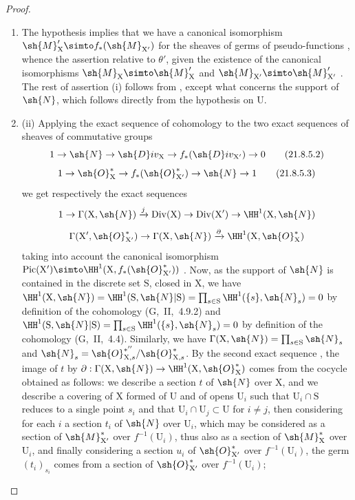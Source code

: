 \begin{proof}
\begin{enumerate}[label=(\roman*)]
  \item The hypothesis implies that we have a canonical isomorphism $\sh{M}'_\mathrm{X}\simto f_*(\sh{M}_{\mathrm{X}'})$ for the sheaves of germs of pseudo-functions , whence the assertion relative to $\theta'$, given the existence of the canonical isomorphisms $\sh{M}_\mathrm{X}\simto\sh{M}'_\mathrm{X}$ and $\sh{M}_{\mathrm{X}'}\simto\sh{M}'_{\mathrm{X}'}$ .
The rest of assertion (i) follows from , except what concerns the support of $\sh{N}$, which follows directly from the hypothesis on $\mathrm{U}$.

  \item (ii) Applying the exact sequence of cohomology to the two exact sequences of sheaves of commutative groups
\[
\label{IV.21.8.5.2}
  1\to\sh{N}\to\sh{D}iv_\mathrm{X}\to f_*(\sh{D}iv_{\mathrm{X}'})\to 0
  \tag{21.8.5.2}
\]
\[
\label{IV.21.8.5.3}
  1\to\sh{O}^*_\mathrm{X}\to f_*(\sh{O}^*_{\mathrm{X}'})\to\sh{N}\to 1
  \tag{21.8.5.3}
\]
we get respectively the exact sequences
\[
  1\to\Gamma(\mathrm{X},\sh{N})\xrightarrow{j}\operatorname{Div}(\mathrm{X})\to\operatorname{Div}(\mathrm{X}')\to\HH^1(\mathrm{X},\sh{N})
\]
\[
  \Gamma(\mathrm{X}',\sh{O}^*_{\mathrm{X}'})\to\Gamma(\mathrm{X},\sh{N})\xrightarrow{\partial}\HH^1(\mathrm{X},\sh{O}^*_\mathrm{X})
\]
taking into account the canonical isomorphism $\operatorname{Pic}(\mathrm{X}')\simto\HH^1(\mathrm{X},f_*(\sh{O}^*_{\mathrm{X}'}))$ .
Now, as the support of $\sh{N}$ is contained in the discrete set $\mathrm{S}$, closed in $\mathrm{X}$, we have $\HH^1(\mathrm{X},\sh{N})=\HH^1(\mathrm{S},\sh{N}|\mathrm{S})=\prod_{s\in\mathrm{S}}\HH^1(\{s\},\sh{N}_s)=0$ by definition of the cohomology (G,~II,~4.9.2) and $\HH^1(\mathrm{S},\sh{N}|\mathrm{S})=\prod_{s\in\mathrm{S}}\HH^1(\{s\},\sh{N}_s)=0$ by definition of the cohomology (G,~II,~4.4).
Similarly, we have $\Gamma(\mathrm{X},\sh{N})=\prod_{s\in\mathrm{S}}\sh{N}_s$ and $\sh{N}_s=\sh{O}^{*''}_{\mathrm{X},s}/\sh{O}^*_{\mathrm{X},s}$.
By the second exact sequence , the image of $t$ by $\partial:\Gamma(\mathrm{X},\sh{N})\to\HH^1(\mathrm{X},\sh{O}^*_\mathrm{X})$ comes from the cocycle obtained as follows: we describe a section $t$ of $\sh{N}$ over $\mathrm{X}$, and we describe a covering of $\mathrm{X}$ formed of $\mathrm{U}$ and of opens $\mathrm{U}_i$ such that $\mathrm{U}_i\cap\mathrm{S}$ reduces to a single point $s_i$ and that $\mathrm{U}_i\cap\mathrm{U}_j\subset\mathrm{U}$ for $i\neq j$, then considering for each $i$ a section $t_i$ of $\sh{N}$ over $\mathrm{U}_i$, which may be considered as a section of $\sh{M}^*_{\mathrm{X}'}$ over $f^{-1}(\mathrm{U}_i)$, thus also as a section of $\sh{M}^*_\mathrm{X}$ over $\mathrm{U}_i$, and finally considering a section $u_i$ of $\sh{O}^*_{\mathrm{X}'}$ over $f^{-1}(\mathrm{U}_i)$, the germ $(t_i)_{s_i}$ comes from a section of $\sh{O}^*_{\mathrm{X}'}$ over $f^{-1}(\mathrm{U}_i)$;

\end{enumerate}
\end{proof}
